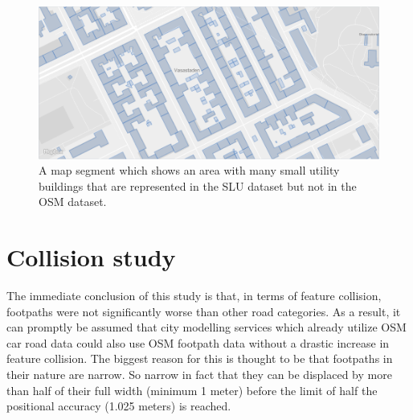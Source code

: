 \documentclass{kththesis}
\begin{document}
\begin{figure}[H]
    \centering
    \includegraphics[width=\textwidth,height=0.5\textheight,keepaspectratio]{img_map_utility_buildings}
    \caption{A map segment which shows an area with many small utility buildings that are represented in the SLU dataset but not in the OSM dataset.}
    \label{fig:osm-slu-map-utility-buildings}
\end{figure}



\section{Collision study}

The immediate conclusion of this study is that, in terms of feature collision, footpaths were not significantly worse than other road categories.
As a result, it can promptly be assumed that city modelling services which already utilize OSM car road data could also use OSM footpath data without a drastic increase in feature collision.
The biggest reason for this is thought to be that footpaths in their nature are narrow.
So narrow in fact that they can be displaced by more than half of their full width (minimum 1 meter) before the limit of half the positional accuracy (1.025 meters) is reached.
\end{document}
